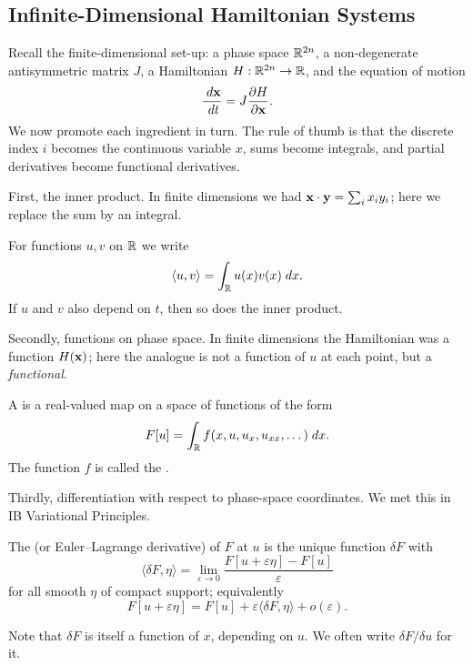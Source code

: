 \documentclass[a4paper]{scrartcl}
\newcommand{\ip}[2]{\langle #1, #2 \rangle}
\begin{document}
\subsection{Infinite-Dimensional Hamiltonian Systems}

Recall the finite-dimensional set-up: a phase space $\mathbb{R}^{2n}$, a non-degenerate antisymmetric matrix $J$, a Hamiltonian $H : \mathbb{R}^{2n}\to\mathbb{R}$, and the equation of motion
$$
\frac{\; d\mathbf{x}}{\; d t} = J\frac{\partial H}{\partial \mathbf{x}}.
$$
We now promote each ingredient in turn. The rule of thumb is that the discrete index $i$ becomes the continuous variable $x$, sums become integrals, and partial derivatives become functional derivatives.

First, the inner product. In finite dimensions we had $\mathbf{x}\cdot\mathbf{y} = \sum_ix_iy_i$; here we replace the sum by an integral.

\begin{notation}
	For functions $u, v$ on $\mathbb{R}$ we write
	$$
	\ip{u}{v} = \int_\R u(x)v(x)\dd x.
	$$
	If $u$ and $v$ also depend on $t$, then so does the inner product.
\end{notation}

Secondly, functions on phase space. In finite dimensions the Hamiltonian was a function $H(\mathbf{x})$; here the analogue is not a function of $u$ at each point, but a \emph{functional}.

\begin{definition}[Functional]
	A  is a real-valued map on a space of functions of the form
	$$
	F[u] = \int_{\mathbb{R}} f(x, u, u_x, u_{xx}, \dots)\; d x.
	$$
	The function $f$ is called the .
\end{definition}

Thirdly, differentiation with respect to phase-space coordinates. We met this in IB Variational Principles.

\begin{definition}
	The  (or Euler--Lagrange derivative) of $F$ at $u$ is the unique function $\delta F$ with
	$$
	\ip{\delta F}{\eta} = \lim_{\varepsilon\to0}\frac{F[u+\varepsilon\eta] - F[u]}{\varepsilon}
	$$
	for all smooth $\eta$ of compact support; equivalently
	$$
	F[u + \varepsilon\eta] = F[u] + \varepsilon\ip{\delta F}{\eta} + o(\varepsilon).
	$$
\end{definition}

Note that $\delta F$ is itself a function of $x$, depending on $u$. We often write $\delta F/\delta u$ for it.
\end{document}
